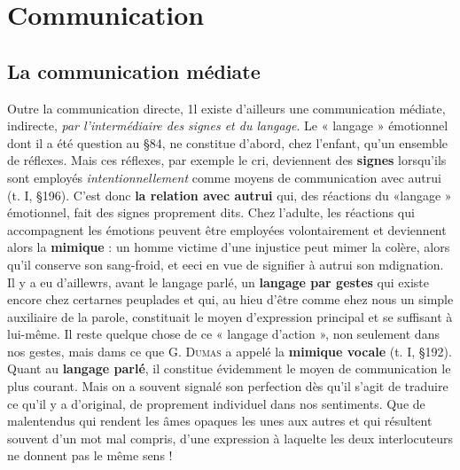 
\section{Communication}
\subsection{La communication médiate}
Outre la communication
directe, 1l existe d’ailleurs une communication médiate, indirecte,
{\it par l'intermédiaire des signes et du langage}. Le « langage » émotionnel
dont il a été question au \S 84, ne constitue d’abord, chez l’enfant,
qu’un ensemble de réflexes. Mais ces réflexes, par exemple le cri,
deviennent des {\bf signes} lorsqu'ils sont employés {\it intentionnellement}
comme moyens de communication avec autrui (t. I, \S 196). C’est
donc {\bf la relation avec autrui} qui, des réactions du «langage » émotionnel,
fait des signes proprement dits. Chez l’adulte, les réactions
qui accompagnent les émotions peuvent être employées volontairement
et deviennent alors la {\bf mimique} : un homme victime d’une injustice
peut mimer la colère, alors qu’il conserve son sang-froid, et eeci en
vue de signifier à autrui son mdignation. Il y a eu d’aillewrs, avant le
langage parlé, un {\bf langage par gestes} qui existe encore chez certarnes
peuplades et qui, au hieu d’être comme ehez nous un simple auxiliaire
de la parole, constituait le moyen d'expression principal et se
suffisant à lui-même. Il reste quelque chose de ce « langage d’action »,
non seulement dans nos gestes, mais dams ce que \textsc{G. Dumas} a appelé
la {\bf mimique vocale} (t. I, \S 192). Quant au {\bf langage parlé}, il constitue
évidemment le moyen de communication le plus courant. Mais
on a souvent signalé son perfection dès qu’il s’agit de traduire ce
qu’il y a d’original, de proprement individuel dans nos sentiments.
Que de malentendus qui rendent les âmes opaques les unes aux autres
et qui résultent souvent d’un mot mal compris, d’une expression à
laquelte les deux interlocuteurs ne donnent pas le même sens !

